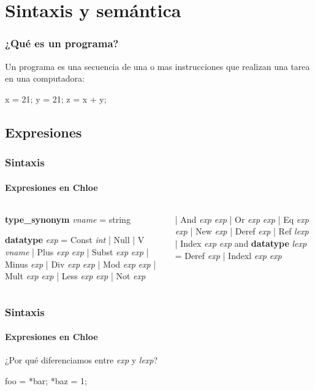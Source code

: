 \section{Sintaxis y semántica}

\begin{frame}[fragile]
\frametitle{¿Qué es un programa?}

Un programa es una secuencia de una o mas instrucciones que realizan una tarea en una computadora:

\begin{example}
\begin{semiverbatim}
x = 21;
y = 21;
z = x + y;
\end{semiverbatim}
\end{example}


\end{frame}

\subsection{Expresiones}

\begin{frame}[fragile]
\frametitle{Sintaxis}
\framesubtitle{Expresiones en Chloe}

\begin{columns}[t]
\begin{semiverbatim}
\textbf{type_synonym} \textit{vname} = string

\textbf{datatype} \textit{exp} = Const \textit{int}
  | Null
  | V      \textit{vname}
  | Plus  \textit{exp} \textit{exp}
  | Subst \textit{exp} \textit{exp}
  | Minus \textit{exp}
  | Div   \textit{exp} \textit{exp}
  | Mod   \textit{exp} \textit{exp}
  | Mult  \textit{exp} \textit{exp}
  | Less  \textit{exp} \textit{exp}
  | Not   \textit{exp}
\end{semiverbatim}
\begin{semiverbatim}
  | And   \textit{exp} \textit{exp}
  | Or    \textit{exp} \textit{exp}
  | Eq    \textit{exp} \textit{exp}
  | New   \textit{exp}
  | Deref \textit{exp}
  | Ref   \textit{lexp}
  | Index \textit{exp} \textit{exp}
and
\textbf{datatype} \textit{lexp} = Deref \textit{exp}
  | Indexl \textit{exp} \textit{exp}
\end{semiverbatim}
\end{columns}


\end{frame}


\begin{frame}[fragile]
\frametitle{Sintaxis}
\framesubtitle{Expresiones en Chloe}

¿Por qué diferenciamos entre \textit{exp} y \textit{lexp}?
\begin{example}
\begin{semiverbatim}
foo = *bar;
*baz = 1;
\end{semiverbatim}
\end{example}



\end{frame}


